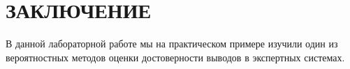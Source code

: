 \section*{ЗАКЛЮЧЕНИЕ}

В данной лабораторной работе мы на практическом примере
изучили один из вероятностных методов
оценки достоверности выводов в экспертных системах.

\newpage